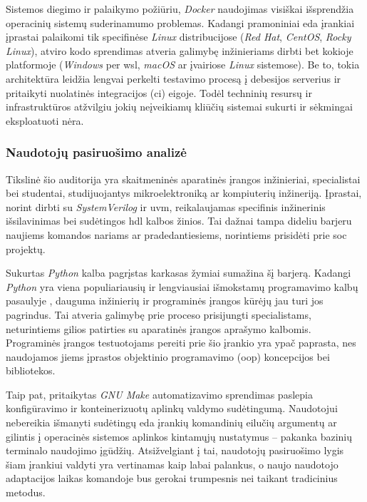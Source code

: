 Sistemos diegimo ir palaikymo požiūriu, \textit{Docker}  naudojimas visiškai išsprendžia operacinių sistemų suderinamumo problemas. Kadangi pramoniniai \gls{eda} įrankiai įprastai palaikomi tik specifinėse \textit{Linux} distribucijose (\textit{Red Hat}, \textit{CentOS}, \textit{Rocky Linux}),  atviro kodo sprendimas atveria galimybę inžinieriams dirbti bet kokioje platformoje (\textit{Windows} per \gls{wsl}, \textit{macOS} ar įvairiose \textit{Linux} sistemose). Be to, tokia architektūra leidžia lengvai perkelti testavimo procesą į debesijos serverius ir pritaikyti nuolatinės integracijos (\gls{ci}) eigoje. Todėl techninių resursų ir infrastruktūros atžvilgiu jokių neįveikiamų kliūčių sistemai sukurti ir sėkmingai eksploatuoti nėra.

\subsubsection{Naudotojų pasiruošimo analizė}

Tikslinė šio  auditorija yra skaitmeninės aparatinės įrangos inžinieriai,  specialistai bei studentai, studijuojantys mikroelektroniką ar kompiuterių inžineriją. Įprastai, norint dirbti su \textit{SystemVerilog} ir \gls{uvm}, reikalaujamas specifinis inžinerinis išsilavinimas bei sudėtingos \gls{hdl} kalbos žinios. Tai dažnai tampa dideliu barjeru naujiems komandos nariams ar pradedantiesiems, norintiems prisidėti prie \gls{soc} projektų.

Sukurtas \textit{Python} kalba pagrįstas karkasas žymiai sumažina šį barjerą. Kadangi \textit{Python} yra viena populiariausių ir lengviausiai išmokstamų programavimo kalbų pasaulyje \cite{language-ratings-2026}, dauguma inžinierių ir programinės įrangos kūrėjų jau turi jos pagrindus. Tai atveria galimybę prie  proceso prisijungti specialistams, neturintiems gilios patirties su aparatinės įrangos aprašymo kalbomis. Programinės įrangos testuotojams pereiti prie šio įrankio yra ypač paprasta, nes naudojamos jiems įprastos objektinio programavimo (\gls{oop}) koncepcijos bei bibliotekos.

Taip pat, pritaikytas \textit{GNU Make} automatizavimo sprendimas paslepia  konfigūravimo ir konteinerizuotų aplinkų valdymo sudėtingumą. Naudotojui nebereikia išmanyti sudėtingų \gls{eda} įrankių komandinių eilučių argumentų ar gilintis į operacinės sistemos aplinkos kintamųjų nustatymus -- pakanka bazinių terminalo naudojimo įgūdžių. Atsižvelgiant į tai, naudotojų pasiruošimo lygis šiam įrankiui valdyti yra vertinamas kaip labai palankus, o naujo naudotojo adaptacijos laikas komandoje bus gerokai trumpesnis nei taikant tradicinius  metodus.

